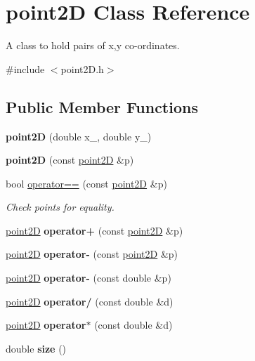 \hypertarget{classpoint2D}{}\section{point2D Class Reference}
\label{classpoint2D}


A class to hold pairs of x,y co-\/ordinates.  




{\ttfamily \#include $<$point2\+D.\+h$>$}

\subsection*{Public Member Functions}
\begin{DoxyCompactItemize}
\item 
\mbox{\label{classpoint2D_ad3c713839ca9768e41c295b2e6e5afa7}} 
{\bfseries point2D} (double x\+\_\+, double y\+\_\+)
\item 
\mbox{\label{classpoint2D_ab5af14144bffe77818139d21003b58bb}} 
{\bfseries point2D} (const \mbox{\hyperlink{classpoint2D}{point2D}} \&p)
\item 
bool \mbox{\hyperlink{classpoint2D_a34b676d196277da05f03e87dc2f88288}{operator==}} (const \mbox{\hyperlink{classpoint2D}{point2D}} \&p)
\begin{DoxyCompactList}\small\item\em Check points for equality. \end{DoxyCompactList}\item 
\mbox{\label{classpoint2D_a76074a1176a4618c53d3f043bfdf6c63}} 
\mbox{\hyperlink{classpoint2D}{point2D}} {\bfseries operator+} (const \mbox{\hyperlink{classpoint2D}{point2D}} \&p)
\item 
\mbox{\label{classpoint2D_a09800bd3d11ba62ff77016c8d120dad6}} 
\mbox{\hyperlink{classpoint2D}{point2D}} {\bfseries operator-\/} (const \mbox{\hyperlink{classpoint2D}{point2D}} \&p)
\item 
\mbox{\label{classpoint2D_ae82aa8f1fb54ea829b5d96bf0abe2ee4}} 
\mbox{\hyperlink{classpoint2D}{point2D}} {\bfseries operator-\/} (const double \&p)
\item 
\mbox{\label{classpoint2D_aa083eccf18a944e03f097ec386d90f41}} 
\mbox{\hyperlink{classpoint2D}{point2D}} {\bfseries operator/} (const double \&d)
\item 
\mbox{\label{classpoint2D_a99f2c435a66f29b578cfbe038e3b0a4f}} 
\mbox{\hyperlink{classpoint2D}{point2D}} {\bfseries operator$\ast$} (const double \&d)
\item 
\mbox{\label{classpoint2D_ae51e5cac280000178e5e1f195a0d261e}} 
double {\bfseries size} ()
\end{DoxyCompactItemize}
